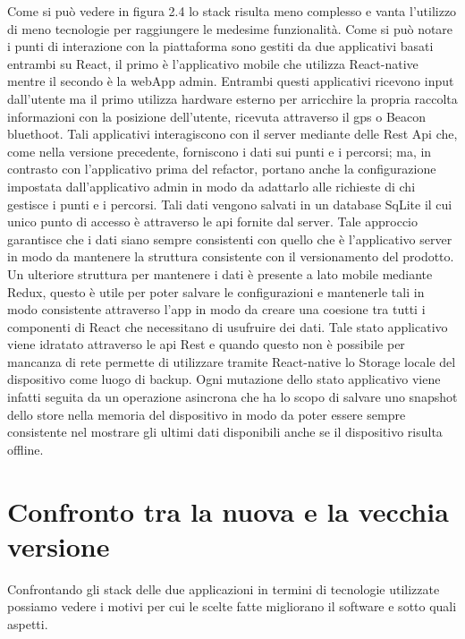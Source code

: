 \vspace{5mm}Come si può vedere in figura 2.4 lo stack risulta meno complesso e vanta l'utilizzo di meno tecnologie per raggiungere le medesime funzionalità. Come si può notare i punti di interazione con la piattaforma sono gestiti da due applicativi basati entrambi su React, il primo è l'applicativo mobile che utilizza React-native mentre il secondo è la webApp admin. Entrambi questi applicativi ricevono input dall'utente ma il primo utilizza hardware esterno per arricchire la propria raccolta informazioni con la posizione dell'utente, ricevuta attraverso il gps o Beacon bluethoot. Tali applicativi interagiscono con il server mediante delle Rest Api che, come nella versione precedente, forniscono i dati sui punti e i percorsi; ma, in contrasto con l'applicativo prima del refactor, portano anche la configurazione impostata dall'applicativo admin in modo da adattarlo alle richieste di chi gestisce i punti e i percorsi. Tali dati vengono salvati in un database SqLite il cui unico punto di accesso è attraverso le api fornite dal server. Tale approccio garantisce che i dati siano sempre consistenti con quello che è l'applicativo server in modo da mantenere la struttura consistente con il versionamento del prodotto. Un ulteriore struttura per mantenere i dati è presente a lato mobile mediante Redux, questo è utile per poter salvare le configurazioni e mantenerle tali in modo consistente attraverso l'app in modo da creare una coesione tra tutti i componenti di React che necessitano di usufruire dei dati. Tale stato applicativo viene idratato attraverso le api Rest e quando questo non è possibile per mancanza di rete permette di utilizzare tramite React-native lo Storage locale del dispositivo come luogo di backup. Ogni mutazione dello stato applicativo viene infatti seguita da un operazione asincrona che ha lo scopo di salvare uno snapshot dello store nella memoria del dispositivo in modo da poter essere sempre consistente nel mostrare gli ultimi dati disponibili anche se il dispositivo risulta offline.

\section{Confronto tra la nuova e la vecchia versione}\vspace{5mm}
Confrontando gli stack delle due applicazioni in termini di tecnologie utilizzate possiamo vedere i motivi per cui le scelte fatte migliorano il software e sotto quali aspetti. \vspace{5mm}

